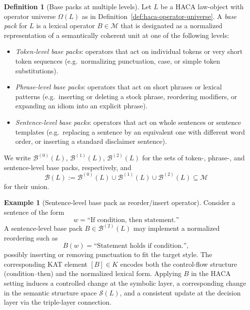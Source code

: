 \documentclass[11pt]{book}
\theoremstyle{plain}
\theoremstyle{definition}
\newtheorem{definition}[theorem]{Definition}
\newtheorem{example}[theorem]{Example}
\theoremstyle{remark}
\begin{document}
\begin{definition}[Base packs at multiple levels]
\label{def:base-packs}
Let $L$ be a HACA law-object with operator universe $\Omega(L)$ as in
Definition~\ref{def:haca-operator-universe}. A \emph{base pack} for
$L$ is a lexical operator $B\in\mathcal{M}$ that is designated as a
normalized representation of a semantically coherent unit at one of
the following levels:
\begin{itemize}
  \item \emph{Token-level base packs}: operators that act on individual
        tokens or very short token sequences (e.g.\ normalizing
        punctuation, case, or simple token substitutions).
  \item \emph{Phrase-level base packs}: operators that act on short
        phrases or lexical patterns (e.g.\ inserting or deleting a
        stock phrase, reordering modifiers, or expanding an idiom into
        an explicit phrase).
  \item \emph{Sentence-level base packs}: operators that act on whole
        sentences or sentence templates (e.g.\ replacing a sentence by
        an equivalent one with different word order, or inserting a
        standard disclaimer sentence).
\end{itemize}
We write $\mathcal{B}^{(0)}(L)$, $\mathcal{B}^{(1)}(L)$,
$\mathcal{B}^{(2)}(L)$ for the sets of token-, phrase-, and
sentence-level base packs, respectively, and
\[
  \mathcal{B}(L)
  :=
  \mathcal{B}^{(0)}(L)\cup\mathcal{B}^{(1)}(L)\cup\mathcal{B}^{(2)}(L)
  \subseteq \mathcal{M}
\]
for their union.
\end{definition}

\begin{example}[Sentence-level base pack as reorder/insert operator]
\label{ex:base-pack-sentence-reorder}
Consider a sentence of the form
\[
  w = \text{``If condition, then statement.''}
\]
A sentence-level base pack $B\in\mathcal{B}^{(2)}(L)$ may implement a
normalized reordering such as
\[
  B(w)
  =
  \text{``Statement holds if condition.''},
\]
possibly inserting or removing punctuation to fit the target style.
The corresponding KAT element $[B]\in K$ encodes both the control-flow
structure (condition–then) and the normalized lexical form. Applying
$B$ in the HACA setting induces a controlled change at the symbolic
layer, a corresponding change in the semantic structure space
$\mathcal{S}(L)$, and a consistent update at the decision layer via
the triple-layer connection.
\end{example}
\end{document}
